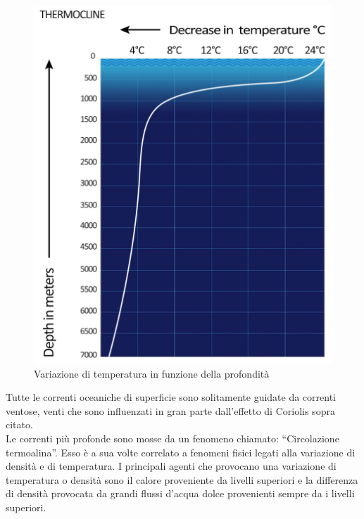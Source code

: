 \begin{figure}[H]
    \centering
    \includegraphics[height=0.4\textwidth]{res/cap 2/termoclino}
    \caption{Variazione di temperatura in funzione della profondità}
\end{figure}\noindent
Tutte le correnti oceaniche di superficie sono solitamente guidate da correnti ventose, venti che sono influenzati in gran parte dall'effetto di Coriolis sopra citato.\\
Le correnti più profonde sono mosse da un fenomeno chiamato: \enquote{Circolazione termoalina}.
Esso è a sua volte correlato a fenomeni fisici legati alla variazione di densità e di temperatura. I principali agenti che provocano una variazione di temperatura o densità sono il calore proveniente da livelli superiori e la differenza di densità provocata da grandi flussi d'acqua dolce provenienti sempre da i livelli superiori.\\

